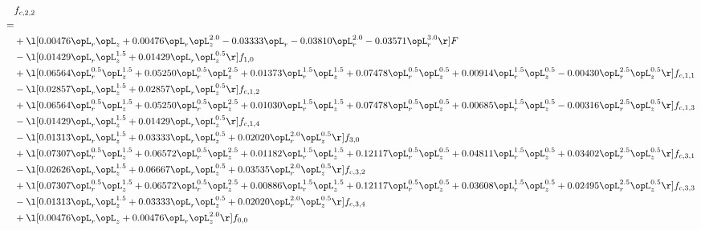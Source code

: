 \begin{alignat}{2} 
\label{eq:f_22_1} 
& f_{c,2,2} \nonumber \\ 
 = \\ 
& + \l[  0.00476 \opL_r \opL_z +  0.00476 \opL_r \opL_z^{2.0}   -0.03333 \opL_r   -0.03810 \opL_r^{2.0}   -0.03571 \opL_r^{3.0}  \r] F \nonumber \\ 
& - \l[  0.01429 \opL_r \opL_z^{1.5} +  0.01429 \opL_r \opL_z^{0.5}  \r] f_{1,0} \nonumber \\ 
& + \l[  0.06564 \opL_r^{0.5} \opL_z^{1.5} +  0.05250 \opL_r^{0.5} \opL_z^{2.5} +  0.01373 \opL_r^{1.5} \opL_z^{1.5} +  0.07478 \opL_r^{0.5} \opL_z^{0.5} +  0.00914 \opL_r^{1.5} \opL_z^{0.5}   -0.00430 \opL_r^{2.5} \opL_z^{0.5}  \r] f_{c,1,1} \nonumber \\ 
& - \l[  0.02857 \opL_r \opL_z^{1.5} +  0.02857 \opL_r \opL_z^{0.5}  \r] f_{c,1,2} \nonumber \\ 
& + \l[  0.06564 \opL_r^{0.5} \opL_z^{1.5} +  0.05250 \opL_r^{0.5} \opL_z^{2.5} +  0.01030 \opL_r^{1.5} \opL_z^{1.5} +  0.07478 \opL_r^{0.5} \opL_z^{0.5} +  0.00685 \opL_r^{1.5} \opL_z^{0.5}   -0.00316 \opL_r^{2.5} \opL_z^{0.5}  \r] f_{c,1,3} \nonumber \\ 
& - \l[  0.01429 \opL_r \opL_z^{1.5} +  0.01429 \opL_r \opL_z^{0.5}  \r] f_{c,1,4} \nonumber \\ 
& - \l[  0.01313 \opL_r \opL_z^{1.5} +  0.03333 \opL_r \opL_z^{0.5} +  0.02020 \opL_r^{2.0} \opL_z^{0.5}  \r] f_{3,0} \nonumber \\ 
& + \l[  0.07307 \opL_r^{0.5} \opL_z^{1.5} +  0.06572 \opL_r^{0.5} \opL_z^{2.5} +  0.01182 \opL_r^{1.5} \opL_z^{1.5} +  0.12117 \opL_r^{0.5} \opL_z^{0.5} +  0.04811 \opL_r^{1.5} \opL_z^{0.5} +  0.03402 \opL_r^{2.5} \opL_z^{0.5}  \r] f_{c,3,1} \nonumber \\ 
& - \l[  0.02626 \opL_r \opL_z^{1.5} +  0.06667 \opL_r \opL_z^{0.5} +  0.03535 \opL_r^{2.0} \opL_z^{0.5}  \r] f_{c,3,2} \nonumber \\ 
& + \l[  0.07307 \opL_r^{0.5} \opL_z^{1.5} +  0.06572 \opL_r^{0.5} \opL_z^{2.5} +  0.00886 \opL_r^{1.5} \opL_z^{1.5} +  0.12117 \opL_r^{0.5} \opL_z^{0.5} +  0.03608 \opL_r^{1.5} \opL_z^{0.5} +  0.02495 \opL_r^{2.5} \opL_z^{0.5}  \r] f_{c,3,3} \nonumber \\ 
& - \l[  0.01313 \opL_r \opL_z^{1.5} +  0.03333 \opL_r \opL_z^{0.5} +  0.02020 \opL_r^{2.0} \opL_z^{0.5}  \r] f_{c,3,4} \nonumber \\ 
& + \l[  0.00476 \opL_r \opL_z +  0.00476 \opL_r \opL_z^{2.0}  \r] f_{0,0} \nonumber \\ 

\end{alignat}
